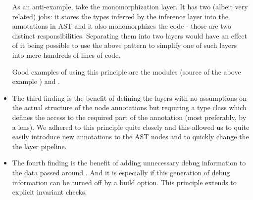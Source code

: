 \begin{itemize}
    As an anti-example, take the monomorphization layer. It has two (albeit very related) jobs: it stores the types inferred by the inference layer into the annotations in AST and it also monomorphizes the code - those are two distinct responsibilities. Separating them into two layers would have an effect of it being possible to use the above pattern to simplify one of such layers into mere hundreds of lines of code.

    Good examples of using this principle are the modules  (source of the above example ) and .

    \item The third finding is the benefit of defining the layers with no assumptions on the actual structure of the node annotations but requiring a type class which defines the access to the required part of the annotation (most preferably, by a lens). We adhered to this principle quite closely and this allowed us to quite easily introduce new annotations to the AST nodes and to quickly change the the layer pipeline.

    \item The fourth finding is the benefit of adding unnecessary debug information to the data passed around . And it is especially if this generation of debug information can be turned off by a build option. This principle extends to explicit invariant checks.

\end{itemize}
